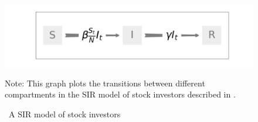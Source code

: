     \begin{figure}[!ht] \centering  %
        \caption{ ~A SIR model of stock investors}
        \label{fig:sir_diagram}
        \centerline{\includegraphics[width=\textwidth]{./figures/flow_diagram}}
        \begin{flushleft}
            {\footnotesize Note: This graph plots the transitions between different compartments in the SIR model of stock investors described in \cite{shiller1989survey}. }
        \end{flushleft}
    \end{figure}
